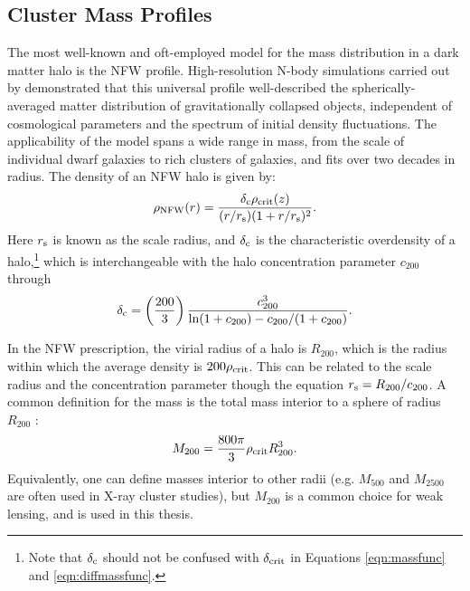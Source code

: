 
\subsection{Cluster Mass Profiles}
\label{sec:Profiles}

The most well-known and oft-employed model for the mass distribution in a dark matter halo is the \ac{NFW} profile. High-resolution N-body simulations carried out by \citet{nfw96} demonstrated that this universal profile well-described the spherically-averaged matter distribution of gravitationally collapsed objects, independent of cosmological parameters and the spectrum of initial density fluctuations. The applicability of the model spans a wide range in mass, from the scale of individual dwarf galaxies to rich clusters of galaxies, and fits over two decades in radius. The density of an \ac{NFW} halo is given by:
\begin{equation}
\rho_{\mathrm{NFW}}(r) = \frac{\delta_{\rm c} \rho_{\mathrm{crit}}(z)}{(r/r_{\rm s})(1+r/r_{\rm s})^2}.
\end{equation}
Here $r_{\rm s}$ is known as the scale radius, and $\delta_{\rm c}$ is the characteristic overdensity of a halo,\footnote{Note that $\delta_{\rm c}$ should not be confused with $\delta_{\rm crit}$ in Equations \ref{eqn:massfunc} and \ref{eqn:diffmassfunc}.} which is interchangeable with the halo concentration parameter $c_{200}$ through
\begin{equation}
\delta_{\rm c} = \left( \frac{200}{3} \right) \frac{c_{200}^3}{{\rm ln}(1+c_{200}) - c_{200}/(1+c_{200})}.
\end{equation}

In the \ac{NFW} prescription, the virial radius of a halo is $R_{200}$, which is the radius within which the average density is $200\rho_{\rm crit}$. This can be related to the scale radius and the concentration parameter though the equation $r_{\rm s} = R_{200}/c_{200}$. A common definition for the mass is the total mass interior to a sphere of radius $R_{200}$ \citep{Wright00}:
\begin{equation}
M_{200} = \frac{800 \pi}{3} \rho_{\rm crit} R_{200}^3.
\end{equation}
Equivalently, one can define masses interior to other radii (e.g. $M_{500}$ and $M_{2500}$ are often used in X-ray cluster studies), but $M_{200}$ is a common choice for weak lensing, and is used in this thesis.

